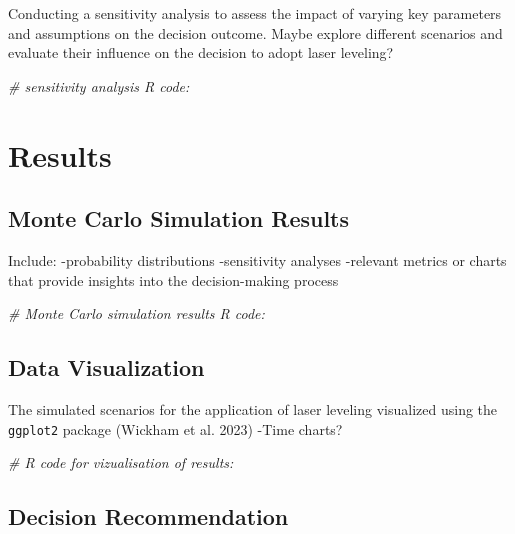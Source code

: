 \documentclass[
]{article}
\newenvironment{Shaded}{\begin{snugshade}}{\end{snugshade}}
\newcommand{\CommentTok}[1]{\textcolor[rgb]{0.56,0.35,0.01}{\textit{#1}}}
\begin{document}
Conducting a sensitivity analysis to assess the impact of varying key
parameters and assumptions on the decision outcome. Maybe explore
different scenarios and evaluate their influence on the decision to
adopt laser leveling?

\begin{Shaded}
\begin{Highlighting}[]
\CommentTok{\# sensitivity analysis R code:}
\end{Highlighting}
\end{Shaded}

\hypertarget{results}{%
\section{Results}\label{results}}

\hypertarget{monte-carlo-simulation-results}{%
\subsection{Monte Carlo Simulation
Results}\label{monte-carlo-simulation-results}}

Include: -probability distributions -sensitivity analyses -relevant
metrics or charts that provide insights into the decision-making process

\begin{Shaded}
\begin{Highlighting}[]
\CommentTok{\# Monte Carlo simulation results R code:}
\end{Highlighting}
\end{Shaded}

\hypertarget{data-visualization}{%
\subsection{Data Visualization}\label{data-visualization}}

The simulated scenarios for the application of laser leveling visualized
using the \texttt{ggplot2} package (Wickham et al. 2023) -Time charts?

\begin{Shaded}
\begin{Highlighting}[]
\CommentTok{\# R code for vizualisation of results:}
\end{Highlighting}
\end{Shaded}

\hypertarget{decision-recommendation}{%
\subsection{Decision Recommendation}\label{decision-recommendation}}
\end{document}
